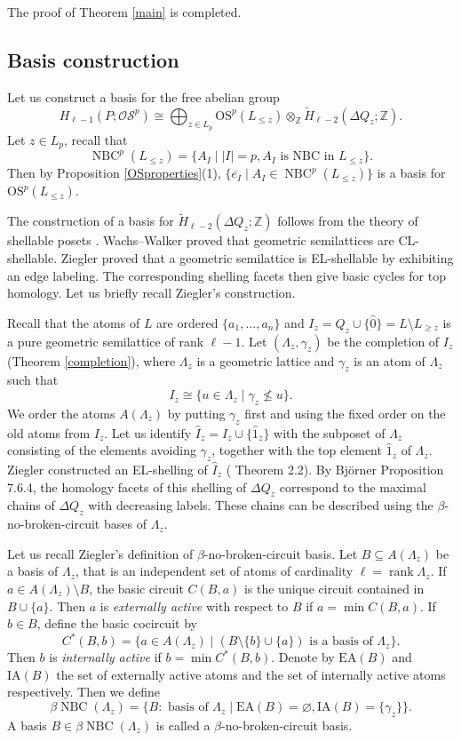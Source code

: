 \documentclass{amsart}
\numberwithin{equation}{section}
\theoremstyle{plain}
\theoremstyle{remark}
\theoremstyle{definition}
\numberwithin{equation}{section}
\newcommand{\Z}{\mathbb{Z}}
\newcommand{\OS}{\mathrm{OS}}
\newcommand{\sOS}{\mathscr{OS}}
\DeclareMathOperator{\rank}{rank}
\DeclareMathOperator{\NBC}{NBC}
\begin{document}
The proof of Theorem \ref{main} is completed.


\subsection{Basis construction}

Let us construct a basis for the free abelian group
\[
H_{\ell-1}(P;\sOS^p)\cong\bigoplus_{z\in L_p}\OS^p(L_{\leq z})\otimes_{\Z}\widetilde{H}_{\ell-2}(\Delta Q_z;\Z).
\]
Let $z\in L_p$, recall that
\[
\NBC^p(L_{\leq z})=\{A_I \mid |I|=p, A_I\text{ is NBC in }L_{\leq z}\}.
\]
Then by Proposition \ref{OSproperties}(1), $\{\overline{e_I}\mid A_I\in\NBC^p(L_{\leq z})\}$ is a basis for $\OS^p(L_{\leq z})$. 

The construction of a basis for $\widetilde{H}_{\ell-2}(\Delta Q_z;\Z)$ follows from the theory of shellable posets \cite{Bjorner1996}. Wachs--Walker \cite{Wachs1986} proved that geometric semilattices are CL-shellable. Ziegler \cite{Ziegler1992} proved that a geometric semilattice is EL-shellable by exhibiting an edge labeling. The corresponding shelling facets then give basic cycles for top homology. Let us briefly recall Ziegler's construction.

Recall that the atoms of $L$ are ordered $\{a_1,\ldots,a_n\}$ and $I_z=Q_z\cup\{\hat{0}\}=L\setminus L_{\geq z}$ is a pure geometric semilattice of rank $\ell-1$. Let $(\Lambda_z,\gamma_z)$ be the completion of $I_z$ (Theorem \ref{completion}), where $\Lambda_z$ is a geometric lattice and $\gamma_z$ is an atom of $\Lambda_z$ such that
\[
I_z\cong\{u\in\Lambda_z\mid \gamma_z\not\leq u\}.
\]
We order the atoms $A(\Lambda_z)$ by putting $\gamma_z$ first and using the fixed order on the old atoms from $I_z$. Let us identify $\widehat I_z=I_z\cup\{\hat 1_z\}$ with the subposet of $\Lambda_z$ consisting of the elements avoiding $\gamma_z$, together with the top element $\hat 1_z$ of $\Lambda_z$. Ziegler constructed an EL-shelling of $\hat I_z$ (\cite{Ziegler1992} Theorem 2.2). By Bj\"orner \cite{Bjorner1992} Proposition 7.6.4, the homology facets of this shelling of $\Delta Q_z$ correspond to the maximal chains of $\Delta Q_z$ with decreasing labels. These chains can be described using the $\beta$-no-broken-circuit bases of $\Lambda_z$.

Let us recall Ziegler's definition of $\beta$-no-broken-circuit basis. Let $B\subseteq A(\Lambda_z)$ be a basis of $\Lambda_z$, that is an independent set of atoms of cardinality $\ell=\rank \Lambda_z$. If $a\in A(\Lambda_z)\setminus B$, the basic circuit $C(B,a)$ is the unique circuit contained in $B\cup\{a\}$. Then $a$ is {\it externally active} with respect to $B$ if $a=\min C(B,a)$. If $b\in B$, define the basic cocircuit by
\[
C^*(B,b)=\{a\in A(\Lambda_z)\mid (B\setminus\{b\}\cup \{a\})\text{ is a basis of }\Lambda_z\}.
\]
Then $b$ is {\it internally active} if $b=\min C^*(B,b)$. Denote by $\mathrm{EA}(B)$ and $\mathrm{IA}(B)$ the set of externally active atoms and the set of internally active atoms respectively. Then we define
\[
\beta\NBC(\Lambda_z)=\{B:\text{ basis of }\Lambda_z\mid \mathrm{EA}(B)=\varnothing,\mathrm{IA}(B)=\{\gamma_z\}\}.
\]
A basis $B\in\beta\NBC(\Lambda_z)$ is called a $\beta$-no-broken-circuit basis.
\end{document}
